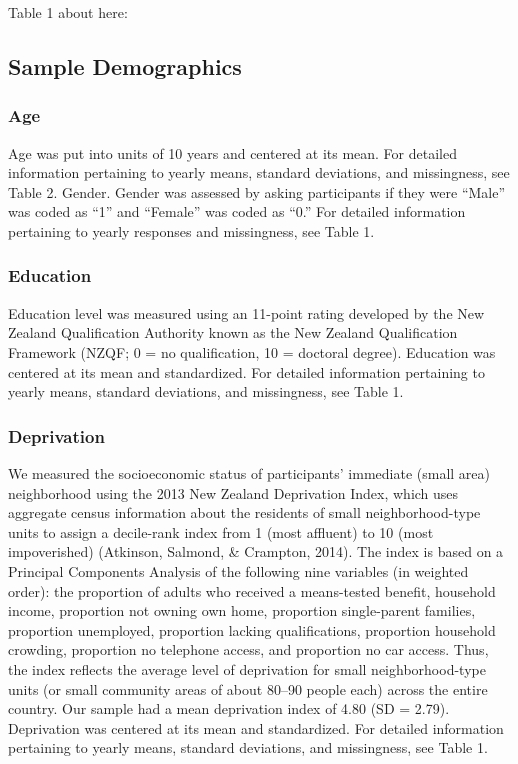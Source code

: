 \documentclass[
  english,
  man,floatsintext]{apa6}
\begin{document}
Table 1 about here:

\hypertarget{sample-demographics}{%
\subsection{Sample Demographics}\label{sample-demographics}}

\hypertarget{age}{%
\subsubsection{Age}\label{age}}

Age was put into units of 10 years and centered at its mean. For detailed information pertaining to yearly means, standard deviations, and missingness, see Table 2.
Gender. Gender was assessed by asking participants if they were \enquote{Male} was coded as \enquote{1} and \enquote{Female} was coded as \enquote{0.} For detailed information pertaining to yearly responses and missingness, see Table 1.

\hypertarget{education}{%
\subsubsection{Education}\label{education}}

Education level was measured using an 11-point rating developed by the New Zealand Qualification Authority known as the New Zealand Qualification Framework (NZQF; 0 = no qualification, 10 = doctoral degree). Education was centered at its mean and standardized. For detailed information pertaining to yearly means, standard deviations, and missingness, see Table 1.

\hypertarget{deprivation}{%
\subsubsection{Deprivation}\label{deprivation}}

We measured the socioeconomic status of participants' immediate (small area) neighborhood using the 2013 New Zealand Deprivation Index, which uses aggregate census information about the residents of small neighborhood-type units to assign a decile-rank index from 1 (most affluent) to 10 (most impoverished) (Atkinson, Salmond, \& Crampton, 2014). The index is based on a Principal Components Analysis of the following nine variables (in weighted order): the proportion of adults who received a means-tested benefit, household income, proportion not owning own home, proportion single-parent families, proportion unemployed, proportion lacking qualifications, proportion household crowding, proportion no telephone access, and proportion no car access. Thus, the index reflects the average level of deprivation for small neighborhood-type units (or small community areas of about 80--90 people each) across the entire country. Our sample had a mean deprivation index of 4.80 (SD = 2.79). Deprivation was centered at its mean and standardized. For detailed information pertaining to yearly means, standard deviations, and missingness, see Table 1.
\end{document}

